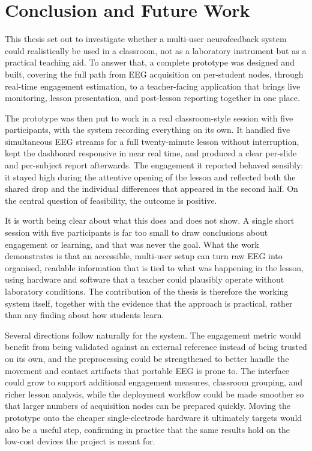 \chapter{Conclusion and Future Work}\label{cap:conclfw}
This thesis set out to investigate whether a multi-user neurofeedback system could realistically be used in a classroom, not as a laboratory instrument but as a practical teaching aid. To answer that, a complete prototype was designed and built, covering the full path from EEG acquisition on per-student nodes, through real-time engagement estimation, to a teacher-facing application that brings live monitoring, lesson presentation, and post-lesson reporting together in one place.

The prototype was then put to work in a real classroom-style session with five participants, with the system recording everything on its own. It handled five simultaneous EEG streams for a full twenty-minute lesson without interruption, kept the dashboard responsive in near real time, and produced a clear per-slide and per-subject report afterwards. The engagement it reported behaved sensibly: it stayed high during the attentive opening of the lesson and reflected both the shared drop and the individual differences that appeared in the second half. On the central question of feasibility, the outcome is positive.

It is worth being clear about what this does and does not show. A single short session with five participants is far too small to draw conclusions about engagement or learning, and that was never the goal. What the work demonstrates is that an accessible, multi-user setup can turn raw EEG into organised, readable information that is tied to what was happening in the lesson, using hardware and software that a teacher could plausibly operate without laboratory conditions. The contribution of the thesis is therefore the working system itself, together with the evidence that the approach is practical, rather than any finding about how students learn.

Several directions follow naturally for the system. The engagement metric would benefit from being validated against an external reference instead of being trusted on its own, and the preprocessing could be strengthened to better handle the movement and contact artifacts that portable EEG is prone to. The interface could grow to support additional engagement measures, classroom grouping, and richer lesson analysis, while the deployment workflow could be made smoother so that larger numbers of acquisition nodes can be prepared quickly. Moving the prototype onto the cheaper single-electrode hardware it ultimately targets would also be a useful step, confirming in practice that the same results hold on the low-cost devices the project is meant for.

